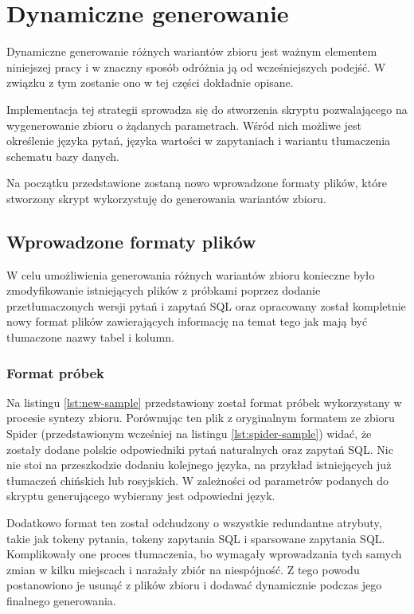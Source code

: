 \section{Dynamiczne generowanie}
Dynamiczne generowanie różnych wariantów zbioru jest ważnym elementem niniejszej pracy i w znaczny sposób odróżnia ją od wcześniejszych podejść. W związku z tym zostanie ono w tej części dokładnie opisane.

Implementacja tej strategii sprowadza się do stworzenia skryptu pozwalającego na wygenerowanie zbioru o żądanych parametrach. Wśród nich możliwe jest określenie języka pytań, języka wartości w zapytaniach i wariantu tłumaczenia schematu bazy danych.

Na początku przedstawione zostaną nowo wprowadzone formaty plików, które stworzony skrypt wykorzystuję do generowania wariantów zbioru.


\subsection{Wprowadzone formaty plików}
W celu umożliwienia generowania różnych wariantów zbioru konieczne było zmodyfikowanie istniejących plików z próbkami poprzez dodanie przetłumaczonych wersji pytań i zapytań SQL oraz opracowany został kompletnie nowy format plików zawierających informację na temat tego jak mają być tłumaczone nazwy tabel i kolumn.

\subsubsection{Format próbek}
Na listingu \ref{lst:new-sample} przedstawiony został format próbek wykorzystany w procesie syntezy zbioru. Porównując ten plik z oryginalnym formatem ze zbioru Spider (przedstawionym wcześniej na listingu \ref{lst:spider-sample}) widać, że zostały dodane polskie odpowiedniki pytań naturalnych oraz zapytań SQL. Nic nie stoi na przeszkodzie dodaniu kolejnego języka, na przykład istniejących już tłumaczeń chińskich lub rosyjskich. W zależności od parametrów podanych do skryptu generującego wybierany jest odpowiedni język. 

\begin{minipage}{\linewidth}

\end{minipage}

Dodatkowo format ten został odchudzony o wszystkie redundantne atrybuty, takie jak tokeny pytania, tokeny zapytania SQL i sparsowane zapytania SQL. Komplikowały one proces tłumaczenia, bo wymagały wprowadzania tych samych zmian w kilku miejscach i narażały zbiór na niespójność. Z tego powodu postanowiono je usunąć z plików zbioru i dodawać dynamicznie podczas jego finalnego generowania.

